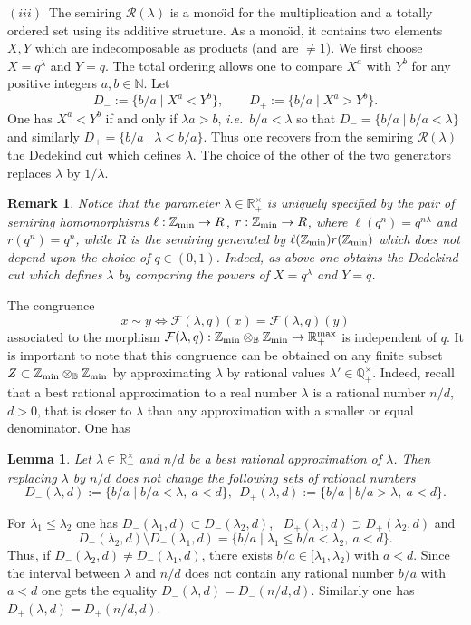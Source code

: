 \documentclass[noams,lp]{compositio}
\newtheorem{lem}[thm]{Lemma}
\newtheorem{rem}[thm]{Remark}
\def\B{{\mathbb B}}
\def\N{{\mathbb N}}
\def\Q{{\mathbb Q}}
\def\R{{\mathbb R}}
\def\Z{{\mathbb Z}}
\def\cF{{\mathcal F}}
\def\cR{{\mathcal R}}
\newcommand{\ie}{{\it i.e.\/}\ }
\def\zmin{\Z_{\rm min}}
\def\rmax{\R_+^{\rm max}}
\begin{document}
$(iii)$~The  semiring $\cR(\lambda)$ is a mono\"{\i}d for the multiplication and a totally ordered set using its additive structure. As a mono\"{\i}d, it contains two elements $X,Y$ which are indecomposable as products (and are $\neq 1$). We first choose $X=q^\lambda$ and $Y=q$. The total ordering allows one to compare $X^a$ with $Y^b$ for any positive integers $a, b\in \N$. Let
$$
D_-:=\{b/a\mid X^a<Y^b\}, \qquad  D_+:=\{b/a\mid X^a>Y^b\}.
$$
One has $X^a<Y^b$ if and only if $\lambda a>b$, \ie $b/a<\lambda$ so that $D_-=\{b/a\mid b/a<\lambda\}$ and similarly $D_+=\{b/a\mid \lambda<b/a\}$. Thus one recovers from the semiring $\cR(\lambda)$ the Dedekind cut which defines $\lambda$. The choice of the other of the two generators replaces $\lambda$ by $1/\lambda$. \endproof

\begin{rem}\label{getlamback}{\rm Notice that the parameter $\lambda\in \R_+^\times$ is uniquely specified by the pair of semiring homomorphisms $\ell:\zmin\to R$, $r:\zmin\to R$, where $\ell(q^n)=q^{n\lambda}$ and $r(q^n)=q^n$, while $R$ is the semiring generated by $\ell(\zmin)r(\zmin)$ which does not depend upon the choice of $q\in (0,1)$. Indeed, as above one obtains the Dedekind cut which defines $\lambda$ by comparing the powers of $X=q^\lambda$ and $Y=q$.
}\end{rem}
The congruence 
\begin{equation}\label{morphism}
x\sim y \iff \cF(\lambda,q)(x)=\cF(\lambda,q)(y)
\end{equation}
associated to the  morphism 
$\cF(\lambda,q): \zmin\otimes_\B \zmin\to \rmax
$
is independent of $q$. It is important to note that this congruence 
can be obtained on any finite subset $Z\subset \zmin\otimes_\B \zmin$ by approximating  $\lambda$ by rational values $\lambda'\in \Q_+^\times$. Indeed, recall that a best rational approximation to a real number $\lambda$ is a rational number $n/d$, $d > 0$, that is closer to $\lambda$ than any approximation with a smaller or equal denominator. One has
\begin{lem}\label{ratapprox} Let $\lambda\in \R_+^\times$ and $n/d$ be a best rational approximation of $\lambda$. Then replacing $\lambda$ by $n/d$ does not change the following sets of rational numbers
$$
D_-(\lambda,d):=\{b/a\mid b/a<\lambda, \  a< d\}, \  \  D_+(\lambda,d):=\{b/a\mid b/a>\lambda, \  a< d\}.
$$
\end{lem}
\proof For $\lambda_1\leq \lambda_2$ one has $D_-(\lambda_1,d)\subset D_-(\lambda_2,d)$,~ $D_+(\lambda_1,d)\supset D_+(\lambda_2,d)$ and 
$$
D_-(\lambda_2,d)\setminus D_-(\lambda_1,d)=\{b/a\mid \lambda_1 \leq b/a<\lambda_2, \  a< d\}.
$$
Thus, if $D_-(\lambda_2,d)\neq D_-(\lambda_1,d)$, there exists $b/a\in [\lambda_1,\lambda_2)$ with $a< d$. Since the interval between  $\lambda$ and $n/d$ does not contain any rational number $b/a$ with $a<d$ one gets the equality $D_-(\lambda,d)=D_-(n/d,d)$. Similarly one has $D_+(\lambda,d)=D_+(n/d,d)$.\endproof
\end{document}

